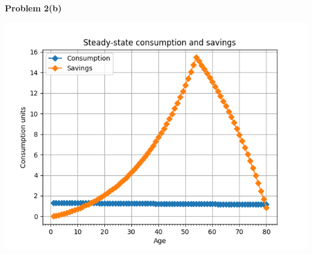 \documentclass[letterpaper,12pt]{article}
\theoremstyle{definition}
\begin{document}
\\
\noindent\textbf{Problem 2(b)}\\
\begin{center}
\includegraphics[scale=0.7]{ss_bc1}
\end{center}
\end{document}
